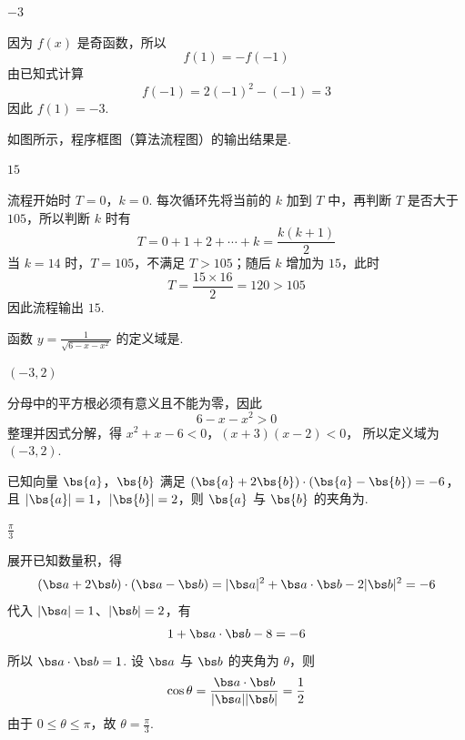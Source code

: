 \begin{answer}
\(-3\)
\end{answer}

\begin{solution}
因为 \(f(x)\) 是奇函数，所以
\[
f(1)=-f(-1)
\]
由已知式计算
\[
f(-1)=2(-1)^{2}-(-1)=3
\]
因此 \(f(1)=-3\).
\end{solution}

\begin{problem}
如图所示，程序框图（算法流程图）的输出结果是\fillinblank{}.

\end{problem}

\begin{answer}
\(15\)
\end{answer}

\begin{solution}
流程开始时 \(T=0\)，\(k=0\). 每次循环先将当前的 \(k\) 加到 \(T\) 中，再判断 \(T\) 是否大于 \(105\)，所以判断 \(k\) 时有
\[
T=0+1+2+\cdots+k=\frac{k(k+1)}2
\]
当 \(k=14\) 时，\(T=105\)，不满足 \(T>105\)；随后 \(k\) 增加为 \(15\)，此时
\[
T=\frac{15\times16}{2}=120>105
\]
因此流程输出 \(15\).
\end{solution}

\begin{problem}
函数 \(y = \frac{1}{\sqrt{6 - x - x^{2}}}\) 的定义域是\fillinblank{}.
\end{problem}

\begin{answer}
\(\left(-3,2\right)\)
\end{answer}

\begin{solution}
分母中的平方根必须有意义且不能为零，因此
\[
6-x-x^{2}>0
\]
整理并因式分解，得
\(x^{2}+x-6<0\)，\((x+3)(x-2)<0\)，
所以定义域为 \(\left(-3,2\right)\).
\end{solution}

\begin{problem}
已知向量 \(\bs{a}\)，\(\bs{b}\) 满足 \((\bs{a} + 2\bs{b}) \cdot (\bs{a} - \bs{b}) = -6\)，且 \(|\bs{a}| = 1\)，\(|\bs{b}| = 2\)，则 \(\bs{a}\) 与 \(\bs{b}\) 的夹角为\fillinblank{}.
\end{problem}

\begin{answer}
\(\frac{\pi}{3}\)
\end{answer}

\begin{solution}
展开已知数量积，得
\[
(\bs a+2\bs b)\cdot(\bs a-\bs b)
=|\bs a|^{2}+\bs a\cdot\bs b-2|\bs b|^{2}=-6
\]
代入 \(|\bs a|=1\)、\(|\bs b|=2\)，有
\[
1+\bs a\cdot\bs b-8=-6
\]
所以 \(\bs a\cdot\bs b=1\). 设 \(\bs a\) 与 \(\bs b\) 的夹角为 \(\theta\)，则
\[
\cos\theta=\frac{\bs a\cdot\bs b}{|\bs a||\bs b|}=\frac12
\]
由于 \(0\leqslant\theta\leqslant\pi\)，故 \(\theta=\frac{\pi}{3}\).
\end{solution}

